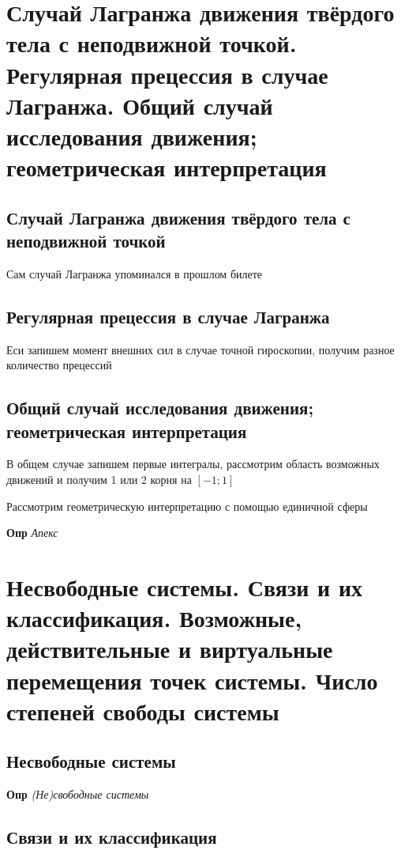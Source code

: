 \documentclass[a4paper, 14pt]{article}
\begin{document}
    \section{Случай Лагранжа движения твёрдого тела с неподвижной точкой.
    Регулярная прецессия в случае Лагранжа.
    Общий случай исследования движения; геометрическая интерпретация}
    
    \subsection{Случай Лагранжа движения твёрдого тела с неподвижной точкой}
    
    Сам случай Лагранжа упоминался в прошлом билете
    
    \subsection{Регулярная прецессия в случае Лагранжа}
    
    Еси запишем момент внешних сил в случае точной гироскопии, получим разное количество прецессий
    
    \subsection{Общий случай исследования движения; геометрическая интерпретация}
    
    В общем случае запишем первые интегралы, рассмотрим область возможных движений и получим 1 или 2 корня на $[-1; 1]$
    
    Рассмотрим геометрическую интерпретацию с помощью единичной сферы
    
    \textbf{Опр} \textit{Апекс}
    
    \section{Несвободные системы.
    Связи и их классификация.
    Возможные, действительные и виртуальные перемещения точек системы.
    Число степеней свободы системы}
    
    \subsection{Несвободные системы}
    
    \textbf{Опр} \textit{(Не)свободные системы}
    
    \subsection{Связи и их классификация}
    
\end{document}
